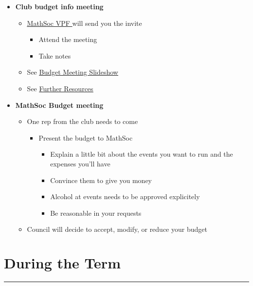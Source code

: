 \documentclass[utf8]{article}
\makeatletter
\renewcommand{\labelitemi}{$\square$}
\renewcommand\labelitemii{\textbullet}
\renewcommand\labelitemiii{$\square$}
\newcommand{\termandyear}{F21}
\newcommand{\MathSocVPF}{\href{mailto:vpf@mathsoc.uwaterloo.ca}{\underline{MathSoc VPF} }}
\newcommand{\budgetSlideshow}{\href{https://docs.google.com/presentation/d/1STBZmvycCzdxlngaaHDIre7LndTr-057gBXYInwFuVg/edit?usp=sharing}{\underline{Budget Meeting Slideshow} }}
\newcommand{\otherresources}{\hyperref[sec:otherresources]{\underline{Further Resources}}}
\makeatother
\begin{document}
\begin{itemize}
\begin{itemize}
\begin{itemize}
\begin{itemize}
                \item Email subject: ``BOT Budget Approval \termandyear - $<$Club Name$>$''
            \end{itemize}
        \end{itemize}
    \end{itemize}
    \item \textbf{Club budget info meeting}
    \begin{itemize}
        \item \MathSocVPF will send you the invite
        \begin{itemize}
            \item Attend the meeting 
            \item Take notes
        \end{itemize}
        \item See \budgetSlideshow
        \item See \otherresources
    \end{itemize}
    \item \textbf{MathSoc Budget meeting}
    \begin{itemize}
        \item One rep from the club needs to come
        \begin{itemize}
            \item Present the budget to MathSoc
            \begin{itemize}
                \item Explain a little bit about the events you want to run and the expenses you’ll have
                \item Convince them to give you money
                \item Alcohol at events needs to be approved explicitely
                \item Be reasonable in your requests
            \end{itemize}
        \end{itemize}
        \item Council will decide to accept, modify, or reduce your budget
    \end{itemize}
\end{itemize}

\renewcommand{\labelitemi}{\textbullet}
\renewcommand\labelitemii{$\square$}
\renewcommand\labelitemiii{\textbullet}
\section*{During the Term}
\par\rule{\textwidth}{0.4pt}\\
\end{document}
